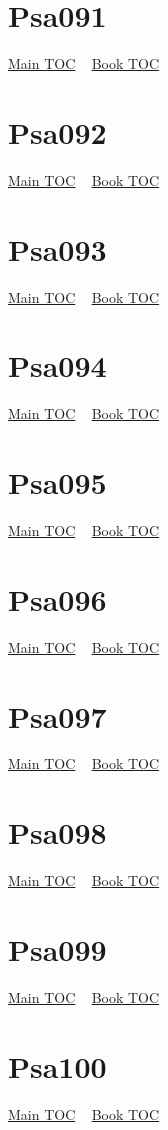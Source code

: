 \documentclass{book}
\begin{document}
  \section{Psa091}\hyperlink{toc}{Main TOC} ~ \hyperref[subsec:Psa]{Book TOC} 
  \section{Psa092}\hyperlink{toc}{Main TOC} ~ \hyperref[subsec:Psa]{Book TOC} 
  \section{Psa093}\hyperlink{toc}{Main TOC} ~ \hyperref[subsec:Psa]{Book TOC} 
  \section{Psa094}\hyperlink{toc}{Main TOC} ~ \hyperref[subsec:Psa]{Book TOC} 
  \section{Psa095}\hyperlink{toc}{Main TOC} ~ \hyperref[subsec:Psa]{Book TOC} 
  \section{Psa096}\hyperlink{toc}{Main TOC} ~ \hyperref[subsec:Psa]{Book TOC} 
  \section{Psa097}\hyperlink{toc}{Main TOC} ~ \hyperref[subsec:Psa]{Book TOC} 
  \section{Psa098}\hyperlink{toc}{Main TOC} ~ \hyperref[subsec:Psa]{Book TOC} 
  \section{Psa099}\hyperlink{toc}{Main TOC} ~ \hyperref[subsec:Psa]{Book TOC} 
  \section{Psa100}\hyperlink{toc}{Main TOC} ~ \hyperref[subsec:Psa]{Book TOC} 
\end{document}
